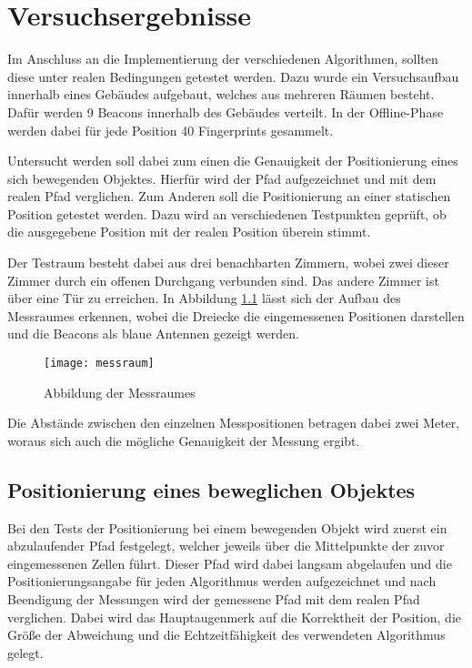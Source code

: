 \chapter{Versuchsergebnisse}
\label{chap:testing}

Im Anschluss an die Implementierung der verschiedenen Algorithmen, sollten diese unter realen Bedingungen getestet werden. 
Dazu wurde ein Versuchsaufbau innerhalb eines Gebäudes aufgebaut, welches aus mehreren Räumen besteht. Dafür werden 9 Beacons innerhalb des Gebäudes verteilt. 
In der Offline-Phase werden dabei für jede Position 40 Fingerprints gesammelt.

Untersucht werden soll dabei zum einen die Genauigkeit der Positionierung eines sich bewegenden Objektes. Hierfür wird der Pfad aufgezeichnet und mit dem realen Pfad verglichen.
Zum Anderen soll die Positionierung an einer statischen Position getestet werden. Dazu wird an verschiedenen Testpunkten geprüft, ob die ausgegebene Position mit der realen Position überein stimmt.

Der Testraum besteht dabei aus drei benachbarten Zimmern, wobei zwei dieser Zimmer durch ein offenen Durchgang verbunden sind. Das andere Zimmer ist über eine Tür zu erreichen. 
In Abbildung \ref{messraum} lässt sich der Aufbau des Messraumes erkennen, wobei die Dreiecke die eingemessenen Positionen darstellen und die Beacons als blaue Antennen gezeigt werden.

\begin{figure}[htb!]
		\centering
	\texttt{[image: messraum]}
	\caption{Abbildung der Messraumes}
	\label{messraum}
\end{figure}

Die Abstände zwischen den einzelnen Messpositionen betragen dabei zwei Meter, woraus sich auch die mögliche Genauigkeit der Messung ergibt.

\section{Positionierung eines beweglichen Objektes}
\label{sec:testing:moving}

Bei den Tests der Positionierung bei einem bewegenden Objekt wird zuerst ein abzulaufender Pfad festgelegt, welcher jeweils über die Mittelpunkte der zuvor eingemessenen Zellen führt. Dieser Pfad wird dabei langsam abgelaufen und die Positionierungsangabe für jeden Algorithmus werden aufgezeichnet und nach Beendigung der Messungen wird der gemessene Pfad mit dem realen Pfad verglichen. Dabei wird das Hauptaugenmerk auf die Korrektheit der Position, die Größe der Abweichung und die Echtzeitfähigkeit des verwendeten Algorithmus gelegt.

